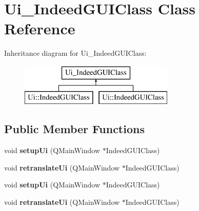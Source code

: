 \hypertarget{class_ui___indeed_g_u_i_class}{}\section{Ui\+\_\+\+Indeed\+G\+U\+I\+Class Class Reference}
\label{class_ui___indeed_g_u_i_class}
Inheritance diagram for Ui\+\_\+\+Indeed\+G\+U\+I\+Class\+:\begin{figure}[H]
\begin{center}
\leavevmode
\includegraphics[height=2.000000cm]{class_ui___indeed_g_u_i_class}
\end{center}
\end{figure}
\subsection*{Public Member Functions}
\begin{DoxyCompactItemize}
\item 
\hypertarget{class_ui___indeed_g_u_i_class_a51000ec4bb3351f12779b7b27e8b985d}{}void {\bfseries setup\+Ui} (Q\+Main\+Window $\ast$Indeed\+G\+U\+I\+Class)\label{class_ui___indeed_g_u_i_class_a51000ec4bb3351f12779b7b27e8b985d}

\item 
\hypertarget{class_ui___indeed_g_u_i_class_a9f24dccbfc4bcdd062ccf5caf0b650f0}{}void {\bfseries retranslate\+Ui} (Q\+Main\+Window $\ast$Indeed\+G\+U\+I\+Class)\label{class_ui___indeed_g_u_i_class_a9f24dccbfc4bcdd062ccf5caf0b650f0}

\item 
\hypertarget{class_ui___indeed_g_u_i_class_a51000ec4bb3351f12779b7b27e8b985d}{}void {\bfseries setup\+Ui} (Q\+Main\+Window $\ast$Indeed\+G\+U\+I\+Class)\label{class_ui___indeed_g_u_i_class_a51000ec4bb3351f12779b7b27e8b985d}

\item 
\hypertarget{class_ui___indeed_g_u_i_class_a9f24dccbfc4bcdd062ccf5caf0b650f0}{}void {\bfseries retranslate\+Ui} (Q\+Main\+Window $\ast$Indeed\+G\+U\+I\+Class)\label{class_ui___indeed_g_u_i_class_a9f24dccbfc4bcdd062ccf5caf0b650f0}

\end{DoxyCompactItemize}
